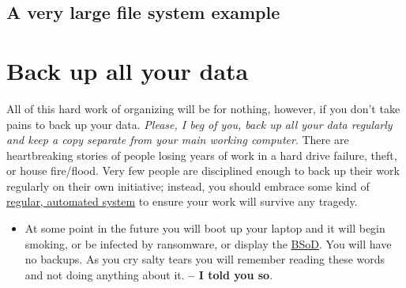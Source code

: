 \subsection{A very large file system example}

{\large
{}  
}

\section{Back up all your data}

All of this hard work of organizing will be for nothing, however, if you don't take pains to back up your data. \emph{Please, I beg of you, back up all your data regularly and keep a copy separate from your main working computer}. There are heartbreaking stories of people losing years of work in a hard drive failure, theft, or house fire/flood. Very few people are disciplined enough to back up their work regularly on their own initiative; instead, you should embrace some kind of \href{https://www.jwz.org/blog/2007/09/psa-backups/}{regular, automated system} to ensure your work will survive any tragedy. 

\begin{itemize}
\item At some point in the future you will boot up your laptop and it will begin smoking, or be infected by ransomware, or display the \href{https://en.wikipedia.org/wiki/Blue_Screen_of_Death}{BSoD}. You will have no backups. As you cry salty tears you will remember reading these words and not doing anything about it. \textbf{ -- I told you so}.
\end{itemize}